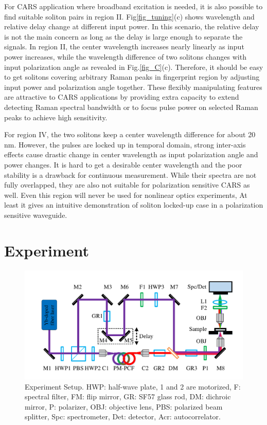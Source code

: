 \documentclass{osa-article}
\begin{document}
For CARS application where broadband excitation is needed, it is also possible to find suitable soliton pairs in region II. Fig\ref{fig_tuning}(c) shows wavelength and relative delay change at different input power. In this scenario, the relative delay is not the main concern as long as the delay is large enough to separate the signals. In region II, the center wavelength increases nearly linearly as input power increases, while the wavelength difference of two solitons changes with input polarization angle as revealed in Fig.\ref{fig_C}(c). Therefore, it should be easy to get solitons covering arbitrary Raman peaks in fingerprint region by adjusting input power and polarization angle together. These flexibly manipulating features are attractive to CARS applications by providing extra capacity to extend detecting Raman spectral bandwidth or to focus pulse power on selected Raman peaks to achieve high sensitivity.

For region IV, the two solitons keep a center wavelength difference for about 20 nm. However, the pulses are locked up in temporal domain, strong inter-axis effects cause drastic change in center wavelength as input polarization angle and power changes. It is hard to get a desirable center wavelength and the poor stability is a drawback for continuous measurement. While their spectra are not fully overlapped, they are also not suitable for polarization sensitive CARS as well\cite{Hofer2017}. Even this region will never be used for nonlinear optics experiments, At least it gives an intuitive demonstration of soliton locked-up case in a polarization sensitive waveguide.   

\section{Experiment}


\begin{figure}[htbp]
    \centering%
    \includegraphics[width=350pt]{fig_sys.pdf}
    \caption{Experiment Setup. HWP: half-wave plate, 1 and 2 are motorized, F: spectral filter, FM: flip mirror, GR: SF57 glass rod, DM: dichroic mirror, P: polarizer, OBJ: objective lens, PBS: polarized beam splitter, Spc: spectrometer, Det: detector, Acr: autocorrelator.}
    \label{fig_EC}\vspace*{-6pt}
\end{figure}
\end{document}
